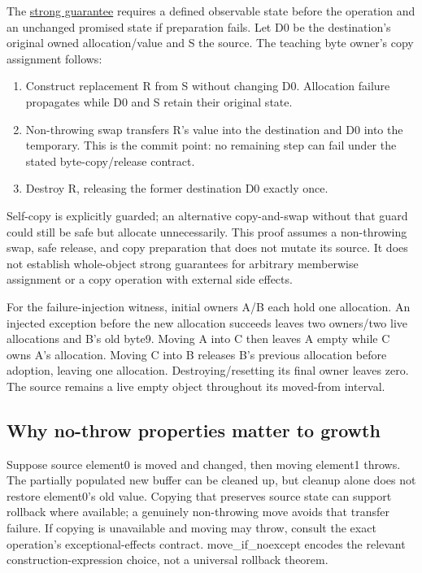 The \hyperref[appendix-bea6beb5350f]{strong guarantee} requires a defined observable state before the operation and an unchanged promised state if preparation fails. Let D0 be the destination's original owned allocation/value and S the source. The teaching byte owner's copy assignment follows:

\begin{enumerate}
\def\labelenumi{\arabic{enumi}.}
\tightlist
\item
  Construct replacement R from S without changing D0. Allocation failure propagates while D0 and S retain their original state.
\item
  Non-throwing swap transfers R's value into the destination and D0 into the temporary. This is the commit point: no remaining step can fail under the stated byte-copy/release contract.
\item
  Destroy R, releasing the former destination D0 exactly once.
\end{enumerate}

Self-copy is explicitly guarded; an alternative copy-and-swap without that guard could still be safe but allocate unnecessarily. This proof assumes a non-throwing swap, safe release, and copy preparation that does not mutate its source. It does not establish whole-object strong guarantees for arbitrary memberwise assignment or a copy operation with external side effects.

For the failure-injection witness, initial owners A/B each hold one allocation. An injected exception before the new allocation succeeds leaves two owners/two live allocations and B's old byte9. Moving A into C then leaves A empty while C owns A's allocation. Moving C into B releases B's previous allocation before adoption, leaving one allocation. Destroying/resetting its final owner leaves zero. The source remains a live empty object throughout its moved-from interval.

\subsection{Why no-throw properties matter to growth}\label{01-foundations-i-ch010-why-no-throw-properties-matter-to-growth}

Suppose source element0 is moved and changed, then moving element1 throws. The partially populated new buffer can be cleaned up, but cleanup alone does not restore element0's old value. Copying that preserves source state can support rollback where available; a genuinely non-throwing move avoids that transfer failure. If copying is unavailable and moving may throw, consult the exact operation's exceptional-effects contract. move\_if\_noexcept encodes the relevant construction-expression choice, not a universal rollback theorem.

